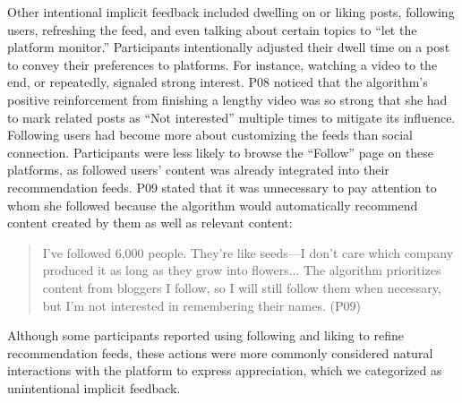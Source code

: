 Other intentional implicit feedback included dwelling on or liking posts, following users, refreshing the feed, and even talking about certain topics to ``let the platform monitor.'' Participants intentionally adjusted their dwell time on a post to convey their preferences to platforms. For instance, watching a video to the end, or repeatedly, signaled strong interest. P08 noticed that the algorithm’s positive reinforcement from finishing a lengthy video was so strong that she had to mark related posts as ``Not interested'' multiple times to mitigate its influence. 
Following users had become more about customizing the feeds than social connection. Participants were less likely to browse the ``Follow'' page on these platforms, as followed users' content was already integrated into their recommendation feeds. P09 stated that it was unnecessary to pay attention to whom she followed because the algorithm would automatically recommend content created by them as well as relevant content:
\begin{quote}
    I've followed 6,000 people. They’re like seeds—I don't care which company produced it as long as they grow into flowers... The algorithm prioritizes content from bloggers I follow, so I will still follow them when necessary, but I’m not interested in remembering their names. (P09)
\end{quote}
Although some participants reported using following and liking to refine recommendation feeds, these actions were more commonly considered natural interactions with the platform to express appreciation, which we categorized as unintentional implicit feedback.

